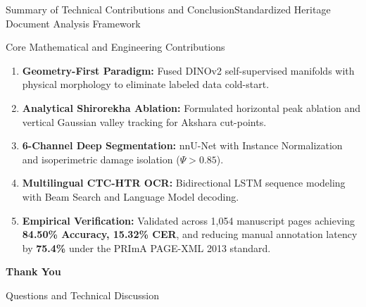 \documentclass[aspectratio=169]{beamer}
\begin{document}
\begin{frame}{Summary of Technical Contributions and Conclusion}{Standardized Heritage Document Analysis Framework}
\begin{block}{Core Mathematical and Engineering Contributions}
\begin{enumerate}
  \item \textbf{Geometry-First Paradigm:} Fused DINOv2 self-supervised manifolds with physical morphology to eliminate labeled data cold-start.
  \item \textbf{Analytical Shirorekha Ablation:} Formulated horizontal peak ablation and vertical Gaussian valley tracking for Akshara cut-points.
  \item \textbf{6-Channel Deep Segmentation:} nnU-Net with Instance Normalization and isoperimetric damage isolation ($\Psi > 0.85$).
  \item \textbf{Multilingual CTC-HTR OCR:} Bidirectional LSTM sequence modeling with Beam Search and Language Model decoding.
  \item \textbf{Empirical Verification:} Validated across 1,054 manuscript pages achieving \textbf{84.50\% Accuracy, 15.32\% CER}, and reducing manual annotation latency by \textbf{75.4\%} under the PRImA PAGE-XML 2013 standard.
\end{enumerate}
\end{block}
\end{frame}

\begin{frame}[plain]
\vfill
\centerline{\Large\textbf{Thank You}}
\vspace{0.5cm}
\centerline{\normalsize Questions and Technical Discussion}
\vfill
\end{frame}
\end{document}
